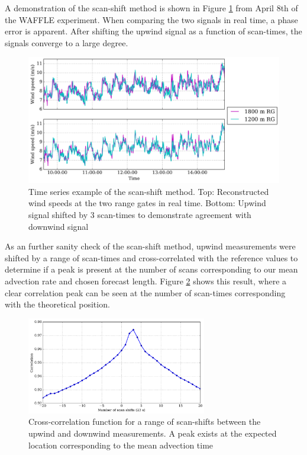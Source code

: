 A demonstration of the scan-shift method is shown in Figure \ref{fig:waffle_scan_shift_example} from April 8th of the WAFFLE experiment. When comparing the two signals in real time, a phase error is apparent. After shifting the upwind signal as a function of scan-times, the signals converge to a large degree.

\begin{figure}[htbp]
    \centering
        \includegraphics[width=1.0\textwidth]{graphics/results/waffle/waffle_scan_shift_example.png}
    \caption{Time series example of the scan-shift method. Top: Reconstructed wind speeds at the two range gates in real time. Bottom: Upwind signal shifted by 3 scan-times to demonstrate agreement with downwind signal}
    \label{fig:waffle_scan_shift_example}
\end{figure}

As an further sanity check of the scan-shift method, upwind measurements were shifted by a range of scan-times and cross-correlated with the reference values to determine if a peak is present at the number of scans corresponding to our mean advection rate and chosen forecast length. Figure \ref{fig:waffle_1200_shifted1800_corrplot} shows this result, where a clear correlation peak can be seen at the number of scan-times corresponding with the theoretical position.

\begin{figure}[htbp]
    \centering
        \includegraphics[width=0.7\textwidth]{graphics/results/waffle/waffle_1200_shifted1800_corrplot.png}
    \caption{Cross-correlation function for a range of scan-shifts between the upwind and downwind measurements. A peak exists at the expected location corresponding to the mean advection time}
    \label{fig:waffle_1200_shifted1800_corrplot}
\end{figure}


